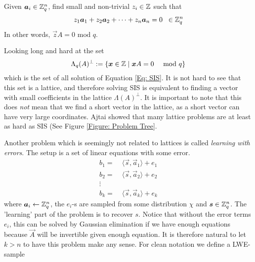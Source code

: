     \begin{definition}
    Given \(\boldsymbol{a}_i\in\mathbb{Z}_q^n\), find small and non-trivial \(z_i \in\mathbb{Z} \) such that
    \begin{equation}
        \label{Eq: SIS}
        z_1\boldsymbol{a}_1 + z_2\boldsymbol{a}_2 + \dots + z_n\boldsymbol{a}_n = 0\;\;\in\mathbb{Z}_q^n
    \end{equation}
    In other words, \(\vec{z}A = 0\text{ mod } q\).
    \end{definition}
    Looking long and hard at the set 
    \begin{align*}
        \Lambda_q(A)^{\perp} := \left\{\boldsymbol{x}\in\mathbb{Z}\;|\; \boldsymbol{x}A = 0\quad\text{ mod }q\right\}
    \end{align*}
    which is the set of all solution of Equation \eqref{Eq: SIS}. It is not hard to see that this set is a lattice, and therefore solving SIS is equivalent  to finding a vector with small coefficients in the lattice \(\Lambda(A)^{\perp}\). It is important to note that this does \emph{not} mean that we find a short vector in the lattice, as a short vector can have very large coordinates. Ajtai\cite{Ajtai} showed that many lattice problems  are at least as hard as SIS (See Figure \ref{Figure: Problem Tree}. \par
    Another problem which is seemingly not related to lattices is called \emph{learning with errors}. The setup is a set of linear equations with some error.
    \begin{equation}
    \label{Equation: LWE}
        \begin{split}
            b_1 = & \;\langle \vec{s}, \vec{a}_1\rangle + e_1\\
            b_2 = & \;\langle \vec{s}, \vec{a}_2\rangle + e_2\\
            \vdots & \\
            b_k = & \;\langle \vec{s}, \vec{a}_k\rangle + e_k
        \end{split}
    \end{equation}
    where \(\boldsymbol{a}_i\leftarrow\mathbb{Z}_q^n\), the \(e_i\)-s are sampled from some distribution \(\chi\) and \(\boldsymbol{s}\in\mathbb{Z}_q^n\). The 'learning' part of the problem is to recover \(s\). Notice that without the error terms \(e_i\), this can be solved by Gaussian elimination if we have enough equations because \(\vec{A}\) will be invertible given enough equation. It is therefore natural to let \(k > n\) to have this problem make any sense. For clean notation we define a LWE-sample
